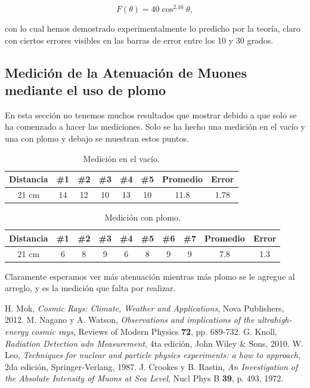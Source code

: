 \documentclass[a4paper,10pt]{article}
\numberwithin{equation}{section}
\begin{document}
\begin{equation}
  F(\theta) = 40\cos^{2.16}{\theta},
\end{equation}

con lo cual hemos demostrado experimentalmente lo predicho por la teoría, claro 
con ciertos errores visibles en las barras de error entre los 10 y 30 grados.



\subsection{Medición de la Atenuación de Muones mediante el uso de plomo}

En esta sección no tenemos muchos resultados que mostrar debido a que solo se ha 
comenzado a hacer las mediciones. Solo se ha hecho una medición en el vacío y 
una con plomo y debajo se muestran estos puntos.

\begin{table}[H]
\centering
\caption{Medición en el vacío.}
\begin{tabular}{|c|c|c|c|c|c|c|c|}
\hline 
Distancia & \#1 & \#2 & \#3 & \#4 & \#5 & Promedio & Error \\ 
\hline 
21 cm & 14 & 12 & 10 & 13 & 10 & 11.8 &  1.78 \\ 
\hline 
\end{tabular}
\end{table}

\begin{table}[H]
\centering
\caption{Medición con plomo.}
\begin{tabular}{|c|c|c|c|c|c|c|c|c|c|}
\hline 
Distancia & \#1 & \#2 & \#3 & \#4 & \#5 & \#6 & \#7 & Promedio & Error \\ 
\hline 
21 cm & 6 & 8 & 9 & 6 & 8 & 9 & 9 & 7.8 & 1.3 \\ 
\hline 
\end{tabular}
\end{table}

Claramente esperamos ver más atenuación mientras más plomo se le agregue al arreglo, 
y es la medición que falta por realizar.

\begin{thebibliography}{10}
H. Mok, \emph{Cosmic Rays: Climate, Weather and Applications}, Nova Publishers, 
2012.
M. Nagano y A. Watson, \emph{Observations and implications of the ultrahigh-energy 
cosmic rays}, Reviews of Modern Physics \textbf{72}, pp. 689-732.
G. Knoll, \emph{Radiation Detection adn Measurement}, 4ta edición, John Wiley \& Sons,
2010.
W. Leo, \emph{Techniques for nuclear and particle physics experiments: a how to 
approach}, 2da edición, Springer-Verlang, 1987.
J. Crookes y B. Rastin, \emph{An Investigation of the Absolute Intensity of Muons at Sea Level}, 
Nucl Phys B \textbf{39}, p. 493, 1972.
\end{thebibliography}
\end{document}
